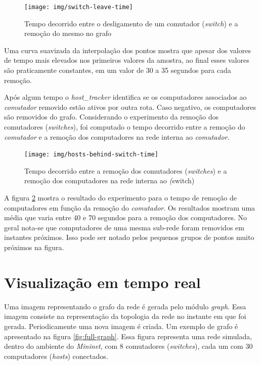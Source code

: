 \begin{figure}[h!]
    \centering
    \label{fig:switch-leave-time}
    \texttt{[image: img/switch-leave-time]}
    \caption{Tempo decorrido entre o desligamento de um comutador
    (\emph{switch}) e a remoção do mesmo no grafo}
\end{figure}

Uma curva suavizada da interpolação dos pontos mostra que apesar dos valores
de tempo mais elevados nos primeiros valores da amostra, ao final esses valores
são praticamente constantes, em um valor de 30 a 35 segundos para cada
remoção.

Após algum tempo o \emph{host\_tracker} identifica se os computadores
associados ao \emph{comutador} removido estão ativos por outra rota.
Caso negativo, os computadores são removidos do grafo.
Considerando o experimento da remoção dos comutadores (\emph{switches}),
foi computado o tempo decorrido entre a remoção do \emph{comutador} e a
remoção dos computadores na rede interna ao \emph{comutador}.

\begin{figure}[h!]
    \centering
    \label{fig:hosts-behind-switch-time}
    \texttt{[image: img/hosts-behind-switch-time]}
    \caption{Tempo decorrido entre a remoção dos comutadores
    (\emph{switches}) e a remoção dos computadores na rede interna ao
    \emph(switch)}
\end{figure}

A figura \ref{fig:hosts-behind-switch-time} mostra o resultado do experimento
para o tempo de remoção de computadores em função da remoção do
\emph{comutador}.
Os resultados mostram uma média que varia entre 40 e 70 segundos para a
remoção dos computadores.
No geral nota-se que computadores de uma mesma sub-rede foram removidos em
instantes próximos.
Isso pode ser notado pelos pequenos grupos de pontos muito próximos na
figura.

\section{Visualização em tempo real}

Uma imagem representando o grafo da rede é gerada pelo módulo \emph{graph}.
Essa imagem consiste na representação da topologia da rede no instante
em que foi gerada.
Periodicamente uma nova imagem é criada.
Um exemplo de grafo é apresentado na figura \ref{fig:full-graph}.
Essa figura representa uma rede simulada, dentro do ambiente do
\emph{Mininet}, com 8 comutadores (\emph{switches}), cada um com 30
computadores (\emph{hosts}) conectados.

